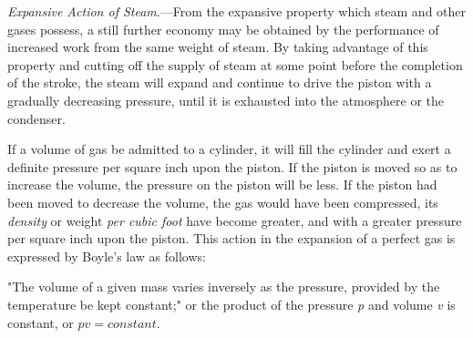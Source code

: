 \documentclass[11pt, a5paper]{book}
\begin{document}
\textit{Expansive Action of Steam}.---From the expansive property
which steam and other gases possess, a still further economy may be
obtained by the performance of increased work from the same weight
of steam.  By taking advantage of this property and cutting off the
supply of steam at some point before the completion of the stroke, the
steam will expand and continue to drive the piston with a gradually
decreasing pressure, until it is exhausted into the atmosphere or the
condenser.\par

If a volume of gas be admitted to a cylinder, it will fill the
cylinder and exert a definite pressure per square inch upon the
piston.  If the piston is moved so as to increase the volume, the
pressure on the piston will be less.  If the piston had been moved to
decrease the volume, the gas would have been compressed, its
\textit{density} or weight \textit{per cubic foot} have become
greater, and with a greater pressure per square inch upon the piston.
This action in the expansion of a perfect gas is expressed by Boyle's
law as follows:\par

"The volume of a given mass varies inversely as the pressure, provided
by the temperature be kept constant;" or the product of the pressure
\textit{p} and volume \textit{v} is constant, or $pv=constant$.\par
\end{document}
